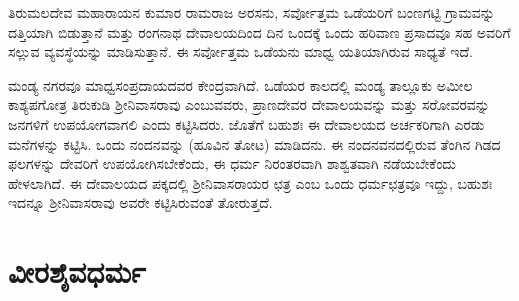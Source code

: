 ತಿರುಮಲದೇವ ಮಹಾರಾಯನ ಕುಮಾರ ರಾಮರಾಜ ಅರಸನು, ಸರ್ವೋತ್ತಮ ಒಡೆಯರಿಗೆ ಬಂಣಗಟ್ಟಿ ಗ್ರಾಮವನ್ನು ದತ್ತಿಯಾಗಿ ಬಿಡುತ್ತಾನೆ ಮತ್ತು ರಂಗನಾಥ ದೇವಾಲಯದಿಂದ ದಿನ ಒಂದಕ್ಕೆ ಒಂದು ಹರಿವಾಣ ಪ್ರಸಾದವೂ ಸಹ ಅವರಿಗೆ ಸಲ್ಲುವ ವ್ಯವಸ್ಥೆಯನ್ನು ಮಾಡಿಸುತ್ತಾನೆ. ಈ ಸರ್ವೋತ್ತಮ ಒಡೆಯನು ಮಾಧ್ವ ಯತಿಯಾಗಿರುವ ಸಾಧ್ಯತೆ ಇದೆ.

ಮಂಡ್ಯ ನಗರವೂ ಮಾಧ್ವಸಂಪ್ರದಾಯದವರ ಕೇಂದ್ರವಾಗಿದೆ. ಒಡೆಯರ ಕಾಲದಲ್ಲಿ ಮಂಡ್ಯ ತಾಲ್ಲೂಕು ಅಮೀಲ ಕಾಶ್ಯಪಗೋತ್ರ ತಿರುಕುಡಿ ಶ‍್ರೀನಿವಾಸರಾವು ಎಂಬುವವರು, ಪ್ರಾಣದೇವರ ದೇವಾಲಯವನ್ನು ಮತ್ತು ಸರೋವರವನ್ನು ಜನಗಳಿಗೆ ಉಪಯೋಗವಾಗಲಿ ಎಂದು ಕಟ್ಟಿಸಿದರು. ಜೊತೆಗೆ ಬಹುಶಃ ಈ ದೇವಾಲಯದ ಅರ್ಚಕರಿಗಾಗಿ ಎರಡು ಮನೆಗಳನ್ನು ಕಟ್ಟಿಸಿ. ಒಂದು ನಂದನವನ್ನು (ಹೂವಿನ ತೋಟ) ಮಾಡಿದನು. ಈ ನಂದನವನದಲ್ಲಿರುವ ತೆಂಗಿನ ಗಿಡದ ಫಲಗಳನ್ನು ದೇವರಿಗೆ ಉಪಯೋಗಿಸಬೇಕೆಂದು, ಈ ಧರ್ಮ ನಿರಂತರವಾಗಿ ಶಾಶ್ವತವಾಗಿ ನಡೆಯಬೇಕೆಂದು ಹೇಳಲಾಗಿದೆ. ಈ ದೇವಾಲಯದ ಪಕ್ಕದಲ್ಲಿ ಶ‍್ರೀನಿವಾಸರಾಯರ ಛತ್ರ ಎಂಬ ಒಂದು ಧರ್ಮಛತ್ರವೂ ಇದ್ದು, ಬಹುಶಃ ಇದನ್ನೂ ಶ‍್ರೀನಿವಾಸರಾವು ಅವರೇ ಕಟ್ಟಿಸಿರುವಂತೆ ತೋರುತ್ತದೆ.


\section*{ವೀರಶೈವಧರ್ಮ}

